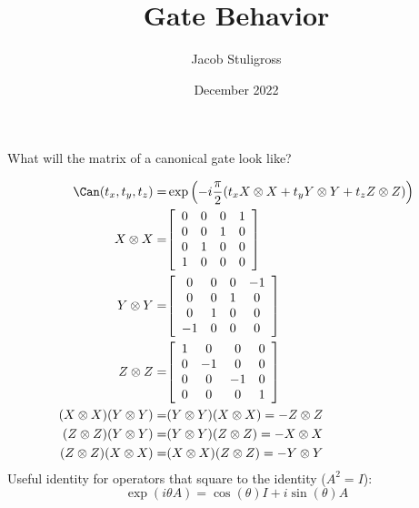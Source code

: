 \documentclass{article}
\title{Gate Behavior}
\author{Jacob Stuligross}
\date{December 2022}
\begin{document}
\maketitle

What will the matrix of a canonical gate look like?

\begin{align*}
  \Can(t_x,t_y,t_z) =& \exp\pqty{-i\frac{\pi}{2}\pqty{t_x X\otimes X + t_y Y\otimes Y + t_z Z\otimes Z}} \\
  X \otimes X =&
  \bqty{
  \begin{array}{cccc}
    0&0&0&1 \\
    0&0&1&0 \\
    0&1&0&0 \\
    1&0&0&0 \\
  \end{array}
  } \\
  Y \otimes Y =&
  \bqty{
  \begin{array}{cccc}
    0&0&0&-1 \\
    0&0&1&0 \\
    0&1&0&0 \\
    -1&0&0&0 \\
  \end{array}
  } \\
  Z \otimes Z =&
  \bqty{
  \begin{array}{cccc}
    1&0&0&0 \\
    0&-1&0&0 \\
    0&0&-1&0 \\
    0&0&0&1 \\
  \end{array}
  }\\
  (X\otimes X)(Y\otimes Y) =& (Y\otimes Y)(X\otimes X) = -Z\otimes Z \\
  (Z\otimes Z)(Y\otimes Y) =& (Y\otimes Y)(Z\otimes Z) = -X\otimes X \\
  (Z\otimes Z)(X\otimes X) =& (X\otimes X)(Z\otimes Z) = -Y\otimes Y \\
\end{align*}
Useful identity for operators that square to the identity ($A^2 = I$):
$$
\exp(i\theta A) = \cos(\theta) I + i\sin(\theta) A
$$
\end{document}
